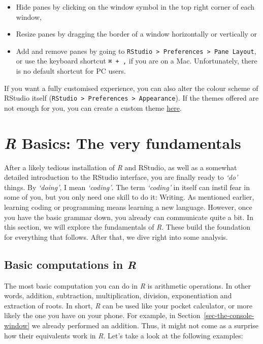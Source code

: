 \documentclass[
  letterpaper,
  DIV=11,
  numbers=noendperiod]{scrreprt}
\begin{document}
\begin{itemize}
\item
  Hide panes by clicking on the window symbol in the top right corner of
  each window,
\item
  Resize panes by dragging the border of a window horizontally or
  vertically or
\item
  Add and remove panes by going to
  \texttt{RStudio\ \textgreater{}\ Preferences\ \textgreater{}\ Pane\ Layout},
  or use the keyboard shortcut \texttt{⌘\ +\ ,} if you are on a Mac.
  Unfortunately, there is no default shortcut for PC users.
\end{itemize}

If you want a fully customised experience, you can also alter the colour
scheme of RStudio itself
(\texttt{RStudio\ \textgreater{}\ Preferences\ \textgreater{}\ Appearance}).
If the themes offered are not enough for you, you can create a custom
theme
\href{https://tmtheme-editor.herokuapp.com/\#!/editor/theme/Monokai}{here}.


\chapter{\texorpdfstring{\emph{R} Basics: The very
fundamentals}{R Basics: The very fundamentals}}\label{sec-r-basics-the-very-fundamentals}

After a likely tedious installation of \emph{R} and RStudio, as well as
a somewhat detailed introduction to the RStudio interface, you are
finally ready to \emph{`do'} things. By \emph{`doing'}, I mean
\emph{`coding'}. The term \emph{`coding'} in itself can instil fear in
some of you, but you only need one skill to do it: Writing. As mentioned
earlier, learning coding or programming means learning a new language.
However, once you have the basic grammar down, you already can
communicate quite a bit. In this section, we will explore the
fundamentals of \emph{R}. These build the foundation for everything that
follows. After that, we dive right into some analysis.

\section{\texorpdfstring{Basic computations in
\emph{R}}{Basic computations in R}}\label{sec-basic-computations-in-r}

The most basic computation you can do in \emph{R} is arithmetic
operations. In other words, addition, subtraction, multiplication,
division, exponentiation and extraction of roots. In short, \emph{R} can
be used like your pocket calculator, or more likely the one you have on
your phone. For example, in Section~\ref{sec-the-console-window} we
already performed an addition. Thus, it might not come as a surprise how
their equivalents work in \emph{R}. Let's take a look at the following
examples:
\end{document}
